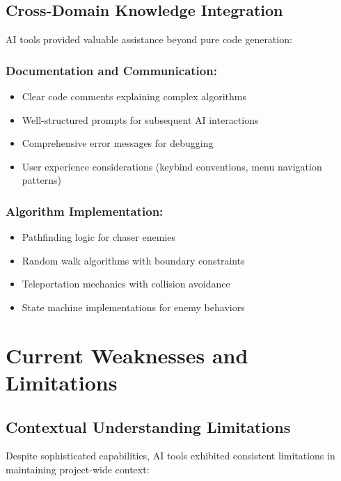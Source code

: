 \documentclass[12pt,a4paper]{article}
\begin{document}
\subsection{Cross-Domain Knowledge Integration}

AI tools provided valuable assistance beyond pure code generation:

\subsubsection*{Documentation and Communication:}
\begin{itemize}
    \item Clear code comments explaining complex algorithms
    \item Well-structured prompts for subsequent AI interactions
    \item Comprehensive error messages for debugging
    \item User experience considerations (keybind conventions, menu navigation patterns)
\end{itemize}

\subsubsection*{Algorithm Implementation:}
\begin{itemize}
    \item Pathfinding logic for chaser enemies
    \item Random walk algorithms with boundary constraints
    \item Teleportation mechanics with collision avoidance
    \item State machine implementations for enemy behaviors
\end{itemize}

\newpage

\section{Current Weaknesses and Limitations}

\subsection{Contextual Understanding Limitations}

Despite sophisticated capabilities, AI tools exhibited consistent limitations in maintaining project-wide context:
\end{document}
